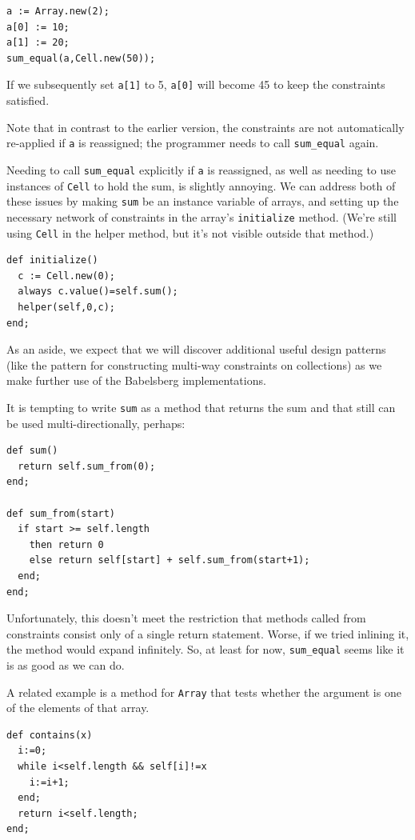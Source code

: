 \documentclass{article}
\begin{document}
\begin{verbatim}
a := Array.new(2);
a[0] := 10;
a[1] := 20;
sum_equal(a,Cell.new(50));
\end{verbatim}

If we subsequently set \verb|a[1]| to 5, \verb|a[0]| will become 45 to
keep the constraints satisfied.

Note that in contrast to the earlier version, the constraints are not
automatically re-applied if \verb|a| is reassigned; the programmer
needs to call \verb|sum_equal| again.

Needing to call \verb|sum_equal| explicitly if \verb|a| is reassigned,
as well as needing to use instances of \verb|Cell| to hold the sum, is
slightly annoying.  We can address both of these issues by making
\verb|sum| be an instance variable of arrays, and setting up the
necessary network of constraints in the array's \verb|initialize|
method.  (We're still using \verb|Cell| in the helper method, but it's
not visible outside that method.)

\begin{verbatim}
def initialize()
  c := Cell.new(0);
  always c.value()=self.sum();
  helper(self,0,c);
end;
\end{verbatim}

As an aside, we expect that we will discover additional useful design
patterns (like the pattern for constructing multi-way constraints on
collections) as we make further use of the Babelsberg implementations.

It is tempting to write \verb|sum| as a method that returns the sum
and that still can be used multi-directionally, perhaps:

\begin{verbatim}
def sum()
  return self.sum_from(0);
end;

def sum_from(start)
  if start >= self.length
    then return 0
    else return self[start] + self.sum_from(start+1);
  end;
end;
\end{verbatim}

Unfortunately, this doesn't meet the restriction that methods called
from constraints consist only of a single return statement.  Worse, if
we tried inlining it, the method would expand infinitely.  So, at
least for now, \verb|sum_equal| seems like it is as good as we can do.

A related example is a method for \verb|Array| that tests whether the
argument is one of the elements of that array.

\begin{verbatim}
def contains(x)
  i:=0;
  while i<self.length && self[i]!=x
    i:=i+1;
  end;
  return i<self.length;
end;
\end{verbatim}
\end{document}
